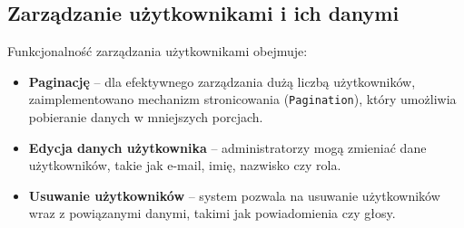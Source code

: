 \subsection{Zarządzanie użytkownikami i ich danymi}

Funkcjonalność zarządzania użytkownikami obejmuje:
\begin{itemize}
    \item \textbf{Paginację} -- dla efektywnego zarządzania dużą liczbą użytkowników, zaimplementowano mechanizm stronicowania (\texttt{Pagination}), który umożliwia pobieranie danych w mniejszych porcjach.
    \item \textbf{Edycja danych użytkownika} -- administratorzy mogą zmieniać dane użytkowników, takie jak e-mail, imię, nazwisko czy rola.
    \item \textbf{Usuwanie użytkowników} -- system pozwala na usuwanie użytkowników wraz z powiązanymi danymi, takimi jak powiadomienia czy głosy.
\end{itemize}

